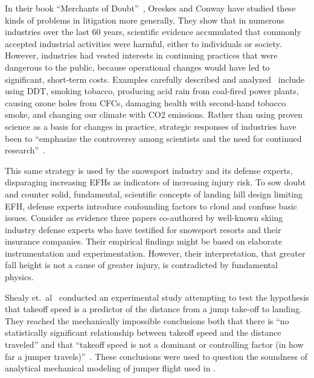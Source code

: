 \documentclass[smallextended]{svjour3}       %
\begin{document}
In their book ``Merchants of Doubt''~\cite{Oreskes2010}, Oreskes and Conway
have studied these kinds of problems in litigation more generally. They show that in numerous industries
over the last 60 years, scientific evidence accumulated that commonly accepted
industrial activities were harmful, either to individuals or society. However,
industries had vested interests in continuing practices that were dangerous to the public, because operational
changes would have led to significant, short-term costs. Examples carefully
described and analyzed~\cite{Oreskes2010} include using DDT, smoking tobacco,
producing acid rain from coal-fired power plants, causing ozone holes from  CFCs,
damaging health with second-hand tobacco smoke, and changing our climate with CO2 emissions. Rather than using proven science as a basis for changes in
practice, strategic responses of industries have been to ``emphasize the
controversy among scientists and the need for continued
research''~\cite{Oreskes2010}. 

This same strategy is used by the snowsport industry and its defense experts, disparaging increasing EFHs as indicators of increasing injury risk.
To sow doubt and counter solid, fundamental, scientific concepts of landing
hill design limiting EFH, defense experts introduce confounding factors to
cloud and confuse basic issues. Consider as evidence three papers
\cite{Shealy2010,Shealy2015,Scher2015} co-authored by well-known skiing
industry defense experts who have testified for snowsport resorts and their
insurance companies. Their empirical findings might be based on elaborate instrumentation and experimentation. However, their interpretation, that greater fall height is not a cause of greater injury, is contradicted by fundamental physics.

Shealy et.~al~\cite{Shealy2010} conducted an experimental study attempting to
test the hypothesis that takeoff speed is a predictor of the distance from a
jump take-off to landing. They reached the mechanically impossible conclusions
both that there is ``no statistically significant relationship between takeoff
speed and the distance traveled'' and that ``takeoff speed is not a dominant or
controlling factor (in how far a jumper travels)''~\cite{Shealy2010}. These
conclusions were used to question the soundness of analytical mechanical
modeling of jumper flight used in \cite{Hubbard2009,McNeil2012}.
\end{document}
